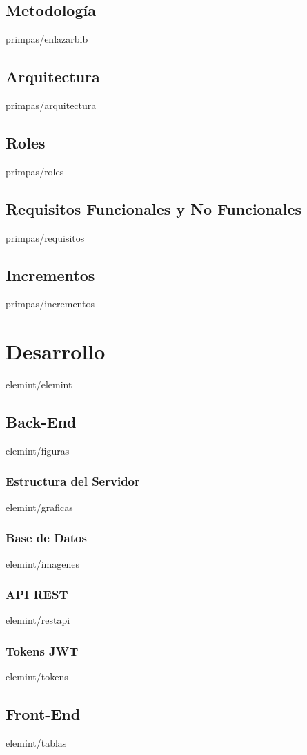 \documentclass[epsbased,copyright,final,printable,covers,extendedindex,firstnumbered,tfg,gnuplot]{tfgtfmthesisuam}
\begin{document}
  \section{Metodología\label{SEC:ENLAZBIBLIOGRAFIA}}{primpas/enlazarbib}
  \section{Arquitectura\label{SEC:ARQUITECTURA}}{primpas/arquitectura}
  \section{Roles\label{SEC:ROLES}}{primpas/roles}
  \section{Requisitos Funcionales y No Funcionales\label{SEC:REQUISITOS}}{primpas/requisitos}
  \section{Incrementos\label{SEC:INCREMENTOS}}{primpas/incrementos}

\chapter{Desarrollo\label{CAP:ELEMINT}}{elemint/elemint}
  \section{Back-End\label{SEC:FIGURAS}}{elemint/figuras}
    \subsection{Estructura del Servidor\label{SS:GRAFICAS}}{elemint/graficas}
    \subsection{Base de Datos\label{SS:INMAGENES}}{elemint/imagenes}
    \subsection{API REST\label{SS:RESTAPI}}{elemint/restapi}
    \subsection{Tokens JWT\label{SS:TOKENS}}{elemint/tokens}
  \section{Front-End\label{SEC:TABLAS}}{elemint/tablas}
\end{document}
